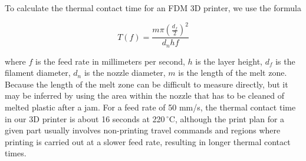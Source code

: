\documentclass[fleqn,10pt]{wlpeerj}
\begin{document}
To calculate the thermal contact time for an FDM 3D printer, we use the
formula

\begin{equation}
T(f) = \frac{m \pi \left(\frac{d_f}{2}\right)^2}{ d_n h f }
\end{equation}

\noindent where $f$ is the feed rate in millimeters per second, $h$ is the
layer height, $d_f$ is the filament diameter, $d_n$ is the nozzle diameter,
$m$ is the length of the melt zone. Because the length of the melt zone can be
difficult to measure directly, but it may be inferred by using the area within
the nozzle that has to be cleaned of melted plastic after a jam. For a feed
rate of 50 mm/s, the thermal contact time in our 3D printer is about 16
seconds at 220$\,^{\circ}\mathrm{C}$, although the print plan for a given part
usually involves non-printing travel commands and regions where printing is
carried out at a slower feed rate, resulting in longer thermal contact times.
\end{document}
